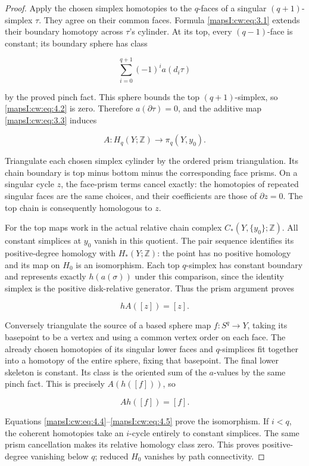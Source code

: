 \begin{proof}
Apply the chosen simplex homotopies to the \(q\)-faces of a singular \((q+1)\)-simplex \(\tau\). They agree on their common faces. Formula \eqref{mapsI:cw:eq:3.1} extends their boundary homotopy across \(\tau\)'s cylinder. At its top, every \((q-1)\)-face is constant; its boundary sphere has class

\begin{equation}
\sum_{i=0}^{q+1}(-1)^i a(d_i\tau)
\label{mapsI:cw:eq:4.2}
\end{equation}

by the proved pinch fact. This sphere bounds the top \((q+1)\)-simplex, so \eqref{mapsI:cw:eq:4.2} is zero. Therefore \(a(\partial\tau)=0\), and the additive map \eqref{mapsI:cw:eq:3.3} induces

\begin{equation}
A:H_q(Y;\mathbb Z)\longrightarrow\pi_q(Y,y_0).
\label{mapsI:cw:eq:4.3}
\end{equation}

Triangulate each chosen simplex cylinder by the ordered prism triangulation. Its chain boundary is top minus bottom minus the corresponding face prisms. On a singular cycle \(z\), the face-prism terms cancel exactly: the homotopies of repeated singular faces are the same choices, and their coefficients are those of \(\partial z=0\). The top chain is consequently homologous to \(z\).

For the top maps work in the actual relative chain complex \(C_*(Y,\{y_0\};\mathbb Z)\). All constant simplices at \(y_0\) vanish in this quotient. The pair sequence identifies its positive-degree homology with \(H_*(Y;\mathbb Z)\): the point has no positive homology and its map on \(H_0\) is an isomorphism. Each top \(q\)-simplex has constant boundary and represents exactly \(h(a(\sigma))\) under this comparison, since the identity simplex is the positive disk-relative generator. Thus the prism argument proves

\begin{equation}
hA([z])=[z].
\label{mapsI:cw:eq:4.4}
\end{equation}

Conversely triangulate the source of a based sphere map \(f:S^q\to Y\), taking its basepoint to be a vertex and using a common vertex order on each face. The already chosen homotopies of its singular lower faces and \(q\)-simplices fit together into a homotopy of the entire sphere, fixing that basepoint. The final lower skeleton is constant. Its class is the oriented sum of the \(a\)-values by the same pinch fact. This is precisely \(A(h([f]))\), so

\begin{equation}
Ah([f])=[f].
\label{mapsI:cw:eq:4.5}
\end{equation}

Equations \eqref{mapsI:cw:eq:4.4}–\eqref{mapsI:cw:eq:4.5} prove the isomorphism. If \(i<q\), the coherent homotopies take an \(i\)-cycle entirely to constant simplices. The same prism cancellation makes its relative homology class zero. This proves positive-degree vanishing below \(q\); reduced \(H_0\) vanishes by path connectivity.
\end{proof}


